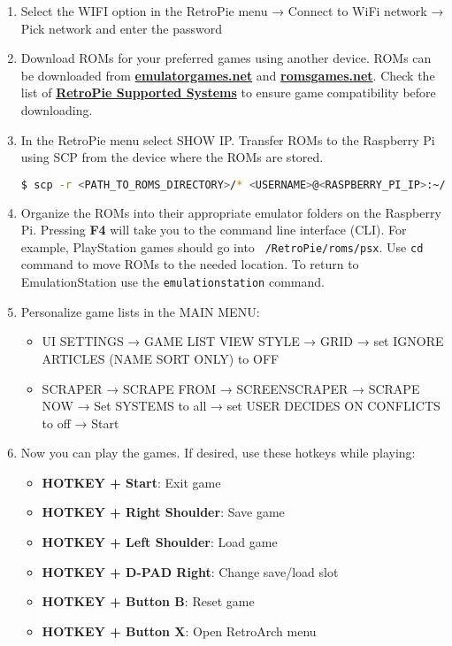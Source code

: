 \begin{enumerate}
\item Select the WIFI option in the RetroPie menu → Connect to WiFi network → Pick network and enter the password

\item Download ROMs for your preferred games using another device. ROMs can be downloaded from \href{https://www.emulatorgames.net}{\textbf{\color{blue}emulatorgames.net}} and \href{https://www.romsgames.net}{\textbf{\color{blue}romsgames.net}}. Check the list of \href{https://retropie.org.uk/docs/Supported-Systems/}{\textbf{\color{blue}RetroPie Supported Systems}} to ensure game compatibility before downloading.

\item In the RetroPie menu select SHOW IP. Transfer ROMs to the Raspberry Pi using SCP from the device where the ROMs are stored.
\begin{lstlisting}[language=bash, breaklines=true, breakatwhitespace=true, columns=fullflexible]
$ scp -r <PATH_TO_ROMS_DIRECTORY>/* <USERNAME>@<RASPBERRY_PI_IP>:~/RetroPie/roms/
\end{lstlisting}

\item Organize the ROMs into their appropriate emulator folders on the Raspberry Pi.
Pressing \textbf{F4} will take you to the command line interface (CLI). For example, PlayStation games should go into \texttt{~/RetroPie/roms/psx}. Use \texttt{cd} command to move ROMs to the needed location. To return to EmulationStation use the \texttt{emulationstation} command.

\item Personalize game lists in the MAIN MENU:
\begin{itemize}
\item UI SETTINGS → GAME LIST VIEW STYLE → GRID → set IGNORE ARTICLES (NAME SORT ONLY) to OFF
\item SCRAPER → SCRAPE FROM → SCREENSCRAPER → SCRAPE NOW → Set SYSTEMS to all → set USER DECIDES ON CONFLICTS to off → Start
\end{itemize}

\item Now you can play the games. If desired, use these hotkeys while playing:
\begin{itemize}
\item \textbf{HOTKEY + Start}: Exit game
\item \textbf{HOTKEY + Right Shoulder}: Save game
\item \textbf{HOTKEY + Left Shoulder}: Load game
\item \textbf{HOTKEY + D-PAD Right}: Change save/load slot
\item \textbf{HOTKEY + Button B}: Reset game
\item \textbf{HOTKEY + Button X}: Open RetroArch menu
\end{itemize}

\end{enumerate}

